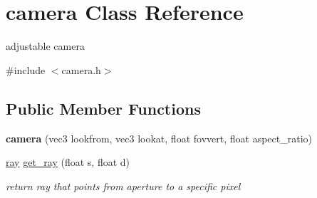 \hypertarget{classcamera}{}\section{camera Class Reference}
\label{classcamera}


adjustable camera  




{\ttfamily \#include $<$camera.\+h$>$}

\subsection*{Public Member Functions}
\begin{DoxyCompactItemize}
\item 
\mbox{\label{classcamera_a584f8f5a7b7f0238a35115414e3d960a}} 
{\bfseries camera} (vec3 lookfrom, vec3 lookat, float fovvert, float aspect\+\_\+ratio)
\item 
\mbox{\label{classcamera_ac07475d14a514c600c799bc7dd2c0907}} 
\hyperlink{classray}{ray} \hyperlink{classcamera_ac07475d14a514c600c799bc7dd2c0907}{get\+\_\+ray} (float s, float d)
\begin{DoxyCompactList}\small\item\em return ray that points from aperture to a specific pixel \end{DoxyCompactList}\end{DoxyCompactItemize}

